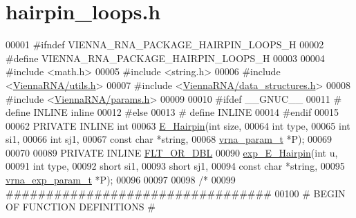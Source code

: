 \hypertarget{hairpin__loops_8h_source}{}\section{hairpin\+\_\+loops.\+h}
\label{hairpin__loops_8h_source}

\begin{DoxyCode}
00001 \textcolor{preprocessor}{#ifndef VIENNA\_RNA\_PACKAGE\_HAIRPIN\_LOOPS\_H}
00002 \textcolor{preprocessor}{#define VIENNA\_RNA\_PACKAGE\_HAIRPIN\_LOOPS\_H}
00003 
00004 \textcolor{preprocessor}{#include <math.h>}
00005 \textcolor{preprocessor}{#include <string.h>}
00006 \textcolor{preprocessor}{#include <\hyperlink{utils_8h}{ViennaRNA/utils.h}>}
00007 \textcolor{preprocessor}{#include <\hyperlink{data__structures_8h}{ViennaRNA/data\_structures.h}>}
00008 \textcolor{preprocessor}{#include <\hyperlink{params_8h}{ViennaRNA/params.h}>}
00009 
00010 \textcolor{preprocessor}{#ifdef \_\_GNUC\_\_}
00011 \textcolor{preprocessor}{# define INLINE inline}
00012 \textcolor{preprocessor}{#else}
00013 \textcolor{preprocessor}{# define INLINE}
00014 \textcolor{preprocessor}{#endif}
00015 
00062 PRIVATE INLINE \textcolor{keywordtype}{int}
00063 \hyperlink{group__loops_gadf943ee9a45b7f4cee9192c06210dace}{E\_Hairpin}(\textcolor{keywordtype}{int}           size,
00064           \textcolor{keywordtype}{int}           type,
00065           \textcolor{keywordtype}{int}           si1,
00066           \textcolor{keywordtype}{int}           sj1,
00067           \textcolor{keyword}{const} \textcolor{keywordtype}{char}    *\textcolor{keywordtype}{string},
00068           \hyperlink{group__energy__parameters_structvrna__param__s}{vrna\_param\_t}  *P);
00069 
00070 
00089 PRIVATE INLINE \hyperlink{group__data__structures_ga31125aeace516926bf7f251f759b6126}{FLT\_OR\_DBL}
00090 \hyperlink{group__loops_ga51fb555974f180b78d76142b2894851c}{exp\_E\_Hairpin}(\textcolor{keywordtype}{int}               u,
00091               \textcolor{keywordtype}{int}               type,
00092               \textcolor{keywordtype}{short}             si1,
00093               \textcolor{keywordtype}{short}             sj1,
00094               \textcolor{keyword}{const} \textcolor{keywordtype}{char}        *\textcolor{keywordtype}{string},
00095               \hyperlink{group__energy__parameters_structvrna__exp__param__s}{vrna\_exp\_param\_t}  *P);
00096 
00097 
00098 \textcolor{comment}{/*}
00099 \textcolor{comment}{ #################################}
00100 \textcolor{comment}{ # BEGIN OF FUNCTION DEFINITIONS #}

\end{DoxyCode}

